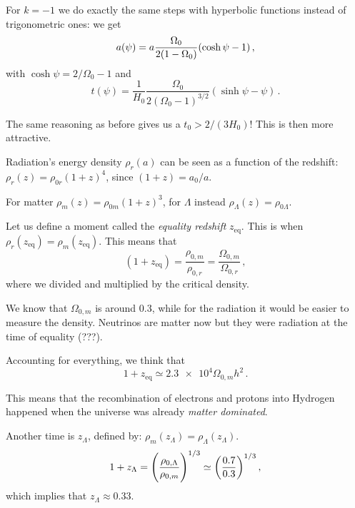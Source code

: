 \documentclass[main.tex]{subfiles}
\begin{document}
For \(k = -1\) we do exactly the same steps with hyperbolic functions instead of trigonometric ones: we get 
%
\begin{equation}
  a ( \psi ) = a \frac{\Omega_0 }{2 (1-\Omega_0)} \qty(\cosh \psi -1)
\,,
\end{equation}
%
with \(\cosh\psi = 2/\Omega_0 -1\) and 
%
\begin{equation}
  t (\psi ) =  \frac{1}{H_0 } \frac{\Omega_0}{2 (\Omega_0 -1)^{3/2}}(\sinh \psi - \psi  )
\,.
\end{equation}
%

The same reasoning as before gives us a \(t_0 > 2 / (3 H_0 )\)! This is then more attractive.

Radiation's energy density \(\rho _r (a)\) can be seen as a function of the redshift: \(\rho _r (z ) = \rho _{0r} (1+z)^{4}\), since \((1+z) = a_0 / a\).

For matter \(\rho _m (z) = \rho_{0m} (1+z)^{3}\), for \(\Lambda \) instead \(\rho _\Lambda (z) = \rho _{0 \Lambda }\).

Let us define a moment called the \emph{equality redshift} \(z _{\text{eq}}\). This is when \(\rho _r (z _{\text{eq}}) = \rho _m (z _{\text{eq}})\). This means that 
%
\begin{equation}
  (1+z _{\text{eq}}) = \frac{\rho _{0,m}}{\rho _{0,r}} 
  = \frac{\Omega_{0,m}}{\Omega_{0,r}}
\,,
\end{equation}
%
where we divided and multiplied by the critical density.

We know that \(\Omega_{0,m}\) is around \num{0.3}, while for the radiation it would be easier to measure the density.
Neutrinos are matter now but they were radiation at the time of equality (???).

Accounting for everything, we think that 
%
\begin{equation}
  1 + z _{\text{eq}} \simeq \num{2.3e4} \Omega_{0, m} h^2
\,.
\end{equation}

This means that the recombination of electrons and protons into Hydrogen happened when the universe was already \emph{matter dominated}.

Another time is \(z_\Lambda \), defined by: \(\rho _m (z_{\Lambda }) = \rho _\Lambda (z_\Lambda )\). 
%
\begin{equation}
  1+ z_\Lambda = \qty(\frac{\rho_{0, \Lambda }}{\rho_{0,m}})^{1/3} \simeq \qty(\frac{0.7}{0.3})^{1/3}
\,,
\end{equation}
%
which implies that \(z_\Lambda \approx \num{0.33}\).
\end{document}
